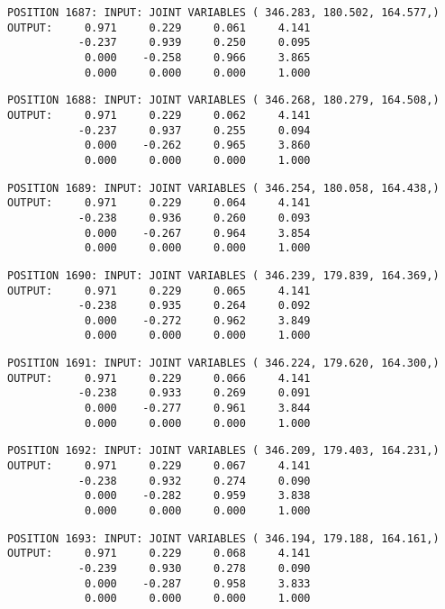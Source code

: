 \begin{verbatim}
POSITION 1687: INPUT: JOINT VARIABLES ( 346.283, 180.502, 164.577,)
OUTPUT:     0.971     0.229     0.061     4.141
           -0.237     0.939     0.250     0.095
            0.000    -0.258     0.966     3.865
            0.000     0.000     0.000     1.000
\end{verbatim} \pagebreak[1]\begin{verbatim}
POSITION 1688: INPUT: JOINT VARIABLES ( 346.268, 180.279, 164.508,)
OUTPUT:     0.971     0.229     0.062     4.141
           -0.237     0.937     0.255     0.094
            0.000    -0.262     0.965     3.860
            0.000     0.000     0.000     1.000
\end{verbatim} \pagebreak[1]\begin{verbatim}
POSITION 1689: INPUT: JOINT VARIABLES ( 346.254, 180.058, 164.438,)
OUTPUT:     0.971     0.229     0.064     4.141
           -0.238     0.936     0.260     0.093
            0.000    -0.267     0.964     3.854
            0.000     0.000     0.000     1.000
\end{verbatim} \pagebreak[1]\begin{verbatim}
POSITION 1690: INPUT: JOINT VARIABLES ( 346.239, 179.839, 164.369,)
OUTPUT:     0.971     0.229     0.065     4.141
           -0.238     0.935     0.264     0.092
            0.000    -0.272     0.962     3.849
            0.000     0.000     0.000     1.000
\end{verbatim} \pagebreak[1]\begin{verbatim}
POSITION 1691: INPUT: JOINT VARIABLES ( 346.224, 179.620, 164.300,)
OUTPUT:     0.971     0.229     0.066     4.141
           -0.238     0.933     0.269     0.091
            0.000    -0.277     0.961     3.844
            0.000     0.000     0.000     1.000
\end{verbatim} \pagebreak[1]\begin{verbatim}
POSITION 1692: INPUT: JOINT VARIABLES ( 346.209, 179.403, 164.231,)
OUTPUT:     0.971     0.229     0.067     4.141
           -0.238     0.932     0.274     0.090
            0.000    -0.282     0.959     3.838
            0.000     0.000     0.000     1.000
\end{verbatim} \pagebreak[1]\begin{verbatim}
POSITION 1693: INPUT: JOINT VARIABLES ( 346.194, 179.188, 164.161,)
OUTPUT:     0.971     0.229     0.068     4.141
           -0.239     0.930     0.278     0.090
            0.000    -0.287     0.958     3.833
            0.000     0.000     0.000     1.000
\end{verbatim} \pagebreak[1]\begin{verbatim}

\end{verbatim}
